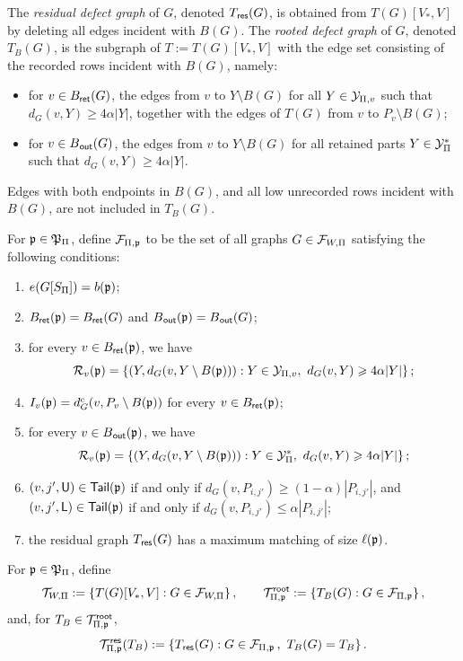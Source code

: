 The \emph{residual defect graph} of $G$, denoted $T_{\hspace{0.2mm}\mathsf{res}}(G)$, is obtained from $T(G)[V_\ast,V]$ by deleting all edges incident with $B(G)$. The \emph{rooted defect graph} of $G$, denoted $T_B(G)$, is the subgraph of $T:=T(G)[V_\ast,V]$ with the edge set consisting of the recorded rows incident with $B(G)$, namely:
\begin{itemize}[leftmargin=\parindent,topsep=5pt]
  \item for $v\in B_{\mathsf{ret}}(G)$, the edges from $v$ to $Y\setminus B(G)$ for all $Y\in{\mathcal Y}_{\Pi,v}$ such that $d_G(v,Y)\geq4\alpha|Y|$, together with the edges of $T(G)$ from $v$ to $P_v\setminus B(G)$;
  \item for $v\in B_{\hspace{0.2mm}\mathsf{out}}(G)$, the edges from $v$ to $Y\setminus B(G)$ for all retained parts $Y\in{\mathcal Y}^\ast_\Pi$ such that $d_G(v,Y)\geq4\alpha|Y|$.
\end{itemize}
Edges with both endpoints in $B(G)$, and all low unrecorded rows incident with $B(G)$, are not included in $T_B(G)$.

\begin{definition}\label{def:profile-class-K1k}
For ${\mathfrak p}\in{\mathfrak P}_\Pi$, define ${\mathcal F}_{\Pi,{\mathfrak p}}$ to be the set of all graphs $G\in{\mathcal F}_{W,\Pi}$ satisfying the following conditions:
\begin{enumerate}[label=\textit{(\roman*)}, ref=(\textit{\roman*}), topsep=5pt]
  \item $e(G[S_\Pi])=b({\mathfrak p})$;
  \item $B_{\mathsf{ret}}({\mathfrak p})=B_{\mathsf{ret}}(G)$ and $B_{\hspace{0.2mm}\mathsf{out}}({\mathfrak p})=B_{\hspace{0.2mm}\mathsf{out}}(G)$;
  \item for every $v\in B_{\mathsf{ret}}({\mathfrak p})$, we have
  $${\mathcal R}_v({\mathfrak p})=\{(Y,d_G(v,Y\setminus B({\mathfrak p}))):Y\in{\mathcal Y}_{\Pi,v},\ d_G(v,Y)\geqslant4\alpha |Y|\}\,;$$
  \item $I_v({\mathfrak p})=d_G^c(v,P_v\setminus B({\mathfrak p}))$ for every $v\in B_{\mathsf{ret}}({\mathfrak p})$;
  \item for every $v\in B_{\hspace{0.2mm}\mathsf{out}}({\mathfrak p})$, we have
  $${\mathcal R}_v({\mathfrak p})=\{(Y,d_G(v,Y\setminus B({\mathfrak p}))):Y\in{\mathcal Y}^\ast_\Pi,\ d_G(v,Y)\geqslant4\alpha |Y|\}\,;$$
  \item $(v,j',{\mathsf{U}})\in{\ensuremath\mathsf{Tail}}({\mathfrak p})$ if and only if $d_G(v,P_{i,j'})\geq(1-\alpha)|P_{i,j'}|$, and $(v,j',{\mathsf{L}})\in{\ensuremath\mathsf{Tail}}({\mathfrak p})$ if and only if $d_G(v,P_{i,j'})\leq\alpha |P_{i,j'}|$;
  \item the residual graph $T_{\hspace{0.2mm}\mathsf{res}}(G)$ has a maximum matching of size $\ell({\mathfrak p})$.
\end{enumerate}
\end{definition}

For ${\mathfrak p}\in{\mathfrak P}_\Pi$, define
$${\mathcal T}_{W,\Pi} := \{T(G)[V_\ast,V]:G\in{\mathcal F}_{W,\Pi}\}\,,\qquad{\mathcal T}^{\mathsf{root}}_{\Pi,{\mathfrak p}}:=\{T_B(G):G\in{\mathcal F}_{\Pi,{\mathfrak p}}\}\,,$$
and, for $T_B\in{\mathcal T}^{\mathsf{root}}_{\Pi,{\mathfrak p}}$,
$$\cT^\res_{\Pi,\frp}(T_B):=\{T_\res(G):G\in\cF_{\Pi,\frp}\,,\ T_B(G)=T_B\}\,.$$

